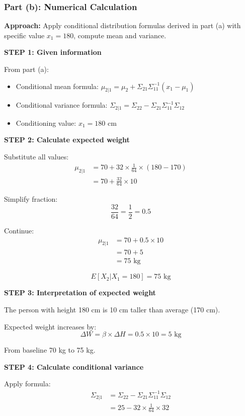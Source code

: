 \documentclass[12pt]{article}
\begin{document}
\subsubsection{Part (b): Numerical Calculation}

\begin{solution}

\textbf{Approach:} Apply conditional distribution formulas derived in part (a) with specific value $x_1 = 180$, compute mean and variance.

\textbf{STEP 1: Given information}

From part (a):
\begin{itemize}
    \item Conditional mean formula: $\mu_{2|1} = \mu_2 + \Sigma_{21}\Sigma_{11}^{-1}(x_1 - \mu_1)$
    \item Conditional variance formula: $\Sigma_{2|1} = \Sigma_{22} - \Sigma_{21}\Sigma_{11}^{-1}\Sigma_{12}$
    \item Conditioning value: $x_1 = 180$ cm
\end{itemize}

\textbf{STEP 2: Calculate expected weight}

Substitute all values:
\begin{align*}
\mu_{2|1} &= 70 + 32 \times \frac{1}{64} \times (180 - 170) \\
&= 70 + \frac{32}{64} \times 10
\end{align*}

Simplify fraction:
\[
\frac{32}{64} = \frac{1}{2} = 0.5
\]

Continue:
\begin{align*}
\mu_{2|1} &= 70 + 0.5 \times 10 \\
&= 70 + 5 \\
&= 75 \text{ kg}
\end{align*}

\[
\boxed{E[X_2 | X_1 = 180] = 75 \text{ kg}}
\]

\textbf{STEP 3: Interpretation of expected weight}

The person with height 180 cm is 10 cm taller than average (170 cm).

Expected weight increases by:
\[
\Delta W = \beta \times \Delta H = 0.5 \times 10 = 5 \text{ kg}
\]

From baseline 70 kg to 75 kg.

\textbf{STEP 4: Calculate conditional variance}

Apply formula:
\begin{align*}
\Sigma_{2|1} &= \Sigma_{22} - \Sigma_{21}\Sigma_{11}^{-1}\Sigma_{12} \\
&= 25 - 32 \times \frac{1}{64} \times 32
\end{align*}


\end{solution}
\end{document}
